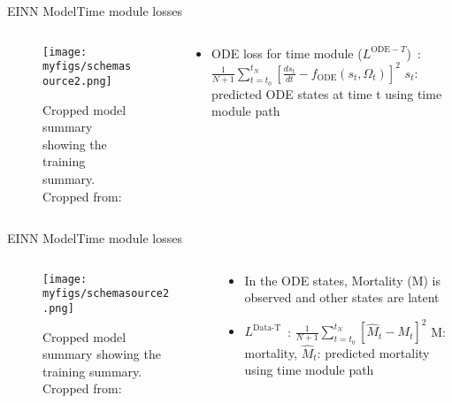 \documentclass[
	aspectratio=169,	%
	onlytextwidth,		%
	t,					%
	]{beamer}
\begin{document}
\begin{frame}[fragile]{EINN Model}{Time module losses}
	\begin{columns}
		
		\begin{column}[T]{.5\textwidth}
			\begin{figure}
				\texttt{[image: myfigs/schemasource2.png]}
				\caption{Cropped model summary showing the training summary. Cropped from:~\cite{main}}
			\end{figure}
		\end{column}
		
		\begin{column}[T]{.5\textwidth}
			\begin{itemize}
				\item ODE loss for time module ($L^{\text{ODE}-T}$)~\cite{main}: $\frac{1}{N+1}\sum_{t=t_{0}}^{t_{N}} \left[ \frac{ds_{t}}{dt} - f_{\text{ODE}}(s_{t}, \Omega_{t}) \right] ^{2} $\newline
				$s_{t}$: predicted ODE states at time t using time module path
			\end{itemize}
		\end{column}
			
\end{columns}
\end{frame}

\begin{frame}[fragile]{EINN Model}{Time module losses}
	\begin{columns}
		
		\begin{column}[T]{.5\textwidth}
			\begin{figure}
				\texttt{[image: myfigs/schemasource2.png]}
				\caption{Cropped model summary showing the training summary. Cropped from:~\cite{main}}
			\end{figure}
		\end{column}
		
		\begin{column}[T]{.5\textwidth}
			\begin{itemize}
				\item<1->In the ODE states, Mortality (M) is observed and other states are latent~\cite{wu} 
				\item<2-> $L^{\text{Data-T}}$~\cite{main}: $\frac{1}{N+1}\sum_{t=t_{0}}^{t_{N}} \left[ \hat{M}_{t} - M_{t} \right]^{2}$ \newline
				M: mortality, $\hat{M}_{t}$: predicted mortality using time module path
			\end{itemize}
		\end{column}
			
\end{columns}
\end{frame}
\end{document}
